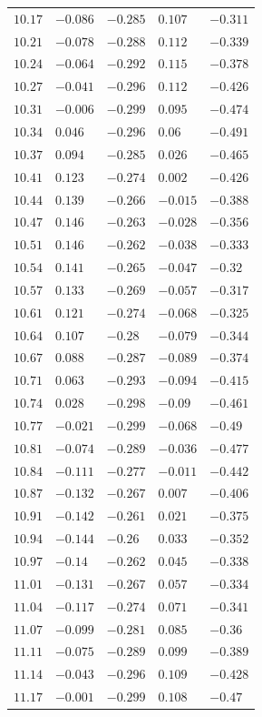 \begin{table}[h]
\begin{tabular}{rllll}
$10.17$&$-0.086$&$-0.285$&$0.107$&$-0.311$\\
$10.21$&$-0.078$&$-0.288$&$0.112$&$-0.339$\\
$10.24$&$-0.064$&$-0.292$&$0.115$&$-0.378$\\
$10.27$&$-0.041$&$-0.296$&$0.112$&$-0.426$\\
$10.31$&$-0.006$&$-0.299$&$0.095$&$-0.474$\\
$10.34$&$0.046$&$-0.296$&$0.06$&$-0.491$\\
$10.37$&$0.094$&$-0.285$&$0.026$&$-0.465$\\
$10.41$&$0.123$&$-0.274$&$0.002$&$-0.426$\\
$10.44$&$0.139$&$-0.266$&$-0.015$&$-0.388$\\
$10.47$&$0.146$&$-0.263$&$-0.028$&$-0.356$\\
$10.51$&$0.146$&$-0.262$&$-0.038$&$-0.333$\\
$10.54$&$0.141$&$-0.265$&$-0.047$&$-0.32$\\
$10.57$&$0.133$&$-0.269$&$-0.057$&$-0.317$\\
$10.61$&$0.121$&$-0.274$&$-0.068$&$-0.325$\\
$10.64$&$0.107$&$-0.28$&$-0.079$&$-0.344$\\
$10.67$&$0.088$&$-0.287$&$-0.089$&$-0.374$\\
$10.71$&$0.063$&$-0.293$&$-0.094$&$-0.415$\\
$10.74$&$0.028$&$-0.298$&$-0.09$&$-0.461$\\
$10.77$&$-0.021$&$-0.299$&$-0.068$&$-0.49$\\
$10.81$&$-0.074$&$-0.289$&$-0.036$&$-0.477$\\
$10.84$&$-0.111$&$-0.277$&$-0.011$&$-0.442$\\
$10.87$&$-0.132$&$-0.267$&$0.007$&$-0.406$\\
$10.91$&$-0.142$&$-0.261$&$0.021$&$-0.375$\\
$10.94$&$-0.144$&$-0.26$&$0.033$&$-0.352$\\
$10.97$&$-0.14$&$-0.262$&$0.045$&$-0.338$\\
$11.01$&$-0.131$&$-0.267$&$0.057$&$-0.334$\\
$11.04$&$-0.117$&$-0.274$&$0.071$&$-0.341$\\
$11.07$&$-0.099$&$-0.281$&$0.085$&$-0.36$\\
$11.11$&$-0.075$&$-0.289$&$0.099$&$-0.389$\\
$11.14$&$-0.043$&$-0.296$&$0.109$&$-0.428$\\
$11.17$&$-0.001$&$-0.299$&$0.108$&$-0.47$\\

\end{tabular}
\end{table}
